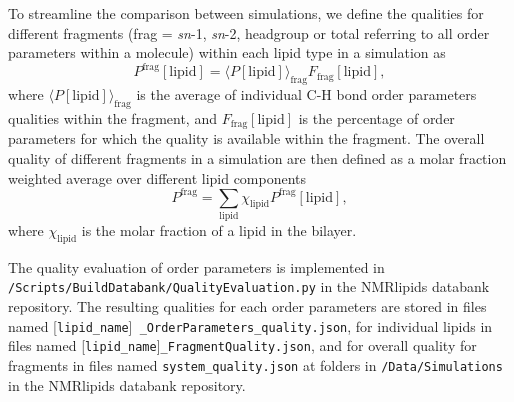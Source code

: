 \documentclass[fleqn,10pt]{wlscirep}
\begin{document}
To streamline the comparison between simulations, we define the qualities for different fragments (frag = \textit{sn}-1, \textit{sn}-2, headgroup or total referring to all order parameters within a molecule) within each lipid type in a simulation as
\begin{equation}
    P^\mathrm{frag}[\mathrm{lipid}] = \langle P[\mathrm{lipid}]\rangle_\mathrm{frag} F_\mathrm{frag}[\mathrm{lipid}],
\end{equation}
where $\langle P[\mathrm{lipid}]\rangle_\mathrm{frag}$ is the average of individual C-H bond order parameters qualities within the fragment, and $F_\mathrm{frag}[\mathrm{lipid}]$ is the percentage of order parameters for which the quality is available within the fragment.
The overall quality of different fragments in a simulation are then defined as a molar fraction weighted average over different lipid components
\begin{equation}
    P^\mathrm{frag} = \sum_\mathrm{lipid} \chi_\mathrm{lipid} P^\mathrm{frag}[\mathrm{lipid}],
\end{equation}
where $\chi_\mathrm{lipid}$ is the molar fraction of a lipid in the bilayer.

The quality evaluation of order parameters is implemented in \texttt{/Scripts/BuildDatabank/QualityEvaluation.py} in the NMRlipids databank repository. The resulting qualities for each order parameters are stored in files named  [\texttt{lipid\_name}]\texttt{ \_OrderParameters\_quality.json}, for individual lipids in files named [\texttt{lipid\_name}]\texttt{\_FragmentQuality.json}, and for overall quality for fragments in files named \texttt{system\_quality.json} at folders in \texttt{/Data/Simulations} in the NMRlipids databank repository. 
\end{document}
